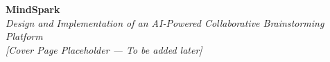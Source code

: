 \documentclass[11pt,a4paper]{report}
\begin{document}
\begin{titlepage}
  \vspace*{\fill}
  \begin{center}
    {\Huge\bfseries\color{PrimaryNavy}MindSpark}\\[1.5em]
    {\Large\textit{\color{SlateGray}Design and Implementation of an AI-Powered Collaborative Brainstorming Platform}}\\[3em]
    {\normalsize\itshape [Cover Page Placeholder --- To be added later]}
  \end{center}
  \vspace*{\fill}
\end{titlepage}





\begingroup
  \setlength{\parskip}{0pt}
  \tableofcontents
\endgroup
\clearpage

\listoffigures
\clearpage

\listoftables
\clearpage











\clearpage
{}


\end{document}
